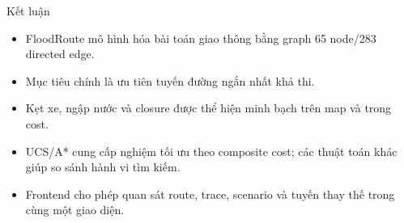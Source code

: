 \documentclass[aspectratio=169,11pt]{beamer}
\begin{document}
\begin{frame}{Kết luận}
\begin{itemize}
  \item FloodRoute mô hình hóa bài toán giao thông bằng graph 65 node/283 directed edge.
  \item Mục tiêu chính là ưu tiên tuyến đường ngắn nhất khả thi.
  \item Kẹt xe, ngập nước và closure được thể hiện minh bạch trên map và trong cost.
  \item UCS/A* cung cấp nghiệm tối ưu theo composite cost; các thuật toán khác giúp so sánh hành vi tìm kiếm.
  \item Frontend cho phép quan sát route, trace, scenario và tuyến thay thế trong cùng một giao diện.
\end{itemize}
\vfill
{}
\end{frame}
\end{document}

